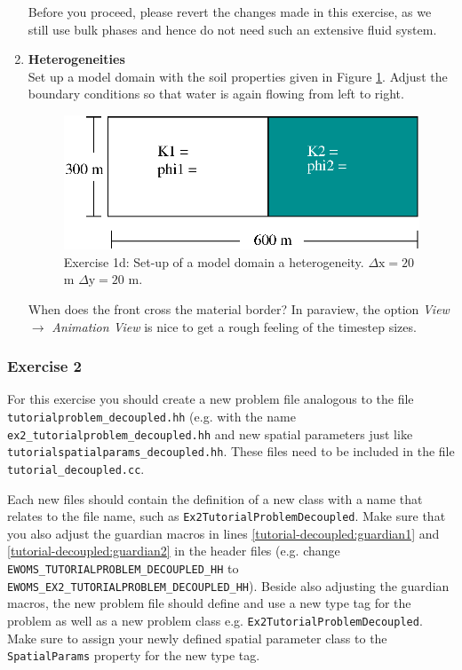 \begin{enumerate}
Before you proceed, please revert the changes made in this exercise,
as we still use bulk phases and hence do not need such an extensive
fluid system.
 
\item \textbf{Heterogeneities}  \\
  Set up a model domain with the soil properties given in Figure
  \ref{tutorial-deoucpled:exercise1_d}. Adjust the boundary conditions
  so that water is again flowing from left to right.
\begin{figure}[ht]
\centering
\includegraphics[width=0.5\linewidth,keepaspectratio]{EPS/exercise1_c.eps}
\caption{Exercise 1d: Set-up of a model domain a heterogeneity. $\Delta \text{x} = 20$ m $\Delta \text{y} = 20$ m.}\label{tutorial-deoucpled:exercise1_d}
\end{figure}
When does the front cross the material border? In paraview, the option \textit{View} $\rightarrow$ \textit{Animation View} is nice to get a rough feeling of the timestep sizes.
\end{enumerate}

\subsubsection{Exercise 2}
For this exercise you should create a new problem file analogous to
the file \texttt{tutorialproblem\_decoupled.hh} (e.g. with the name 
\texttt{ex2\_tutorialproblem\_decoupled.hh} and new spatial parameters 
just like \texttt{tutorialspatialparams\_decoupled.hh}. These files need to
be included in the file \texttt{tutorial\_decoupled.cc}. 

Each new files should contain the definition of a new class with a 
name that relates to the file name, such as \texttt{Ex2TutorialProblemDecoupled}. 
Make sure that you also adjust the guardian
macros in lines \ref{tutorial-decoupled:guardian1} and \ref{tutorial-decoupled:guardian2}
 in the header files (e.g. change \\
\texttt{EWOMS\_TUTORIALPROBLEM\_DECOUPLED\_HH} to
\texttt{EWOMS\_EX2\_TUTORIALPROBLEM\_DECOUPLED\_HH}).  Beside also adjusting the guardian macros, 
the new problem file should define and use a new type tag for the problem as well as a new problem class
e.g. \texttt{Ex2TutorialProblemDecoupled}. Make sure to assign your newly defined spatial 
parameter class to the \texttt{SpatialParams} property for the new 
type tag. 

